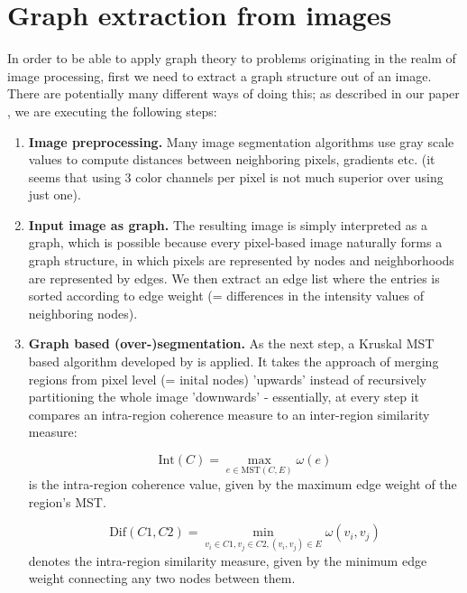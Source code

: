 \section{Graph extraction from images}
\label{sect:graph_ext}
	
	In order to be able to apply graph theory to problems originating in the realm of image processing, first we need to extract a graph structure out of an image. There are potentially many different ways of doing this; as described in our paper \citep{GraphExtractPaper}, we are executing the following steps:
	
	\begin{enumerate}
		\item \textbf{Image preprocessing.} Many image segmentation algorithms use gray scale values to compute distances between neighboring pixels, gradients etc. (it seems that using 3 color channels per pixel is not much superior over using just one).
		\item \textbf{Input image as graph.} The resulting image is simply interpreted as a graph, which is possible because every pixel-based image naturally forms a graph structure, in which pixels are represented by nodes and neighborhoods are represented by edges. We then extract an edge list where the entries is sorted according to edge weight (= differences in the intensity values of neighboring nodes).
		\item \textbf{Graph based (over-)segmentation.} As the next step, a Kruskal MST based algorithm developed by \citep{FelzenszwalbHuttenlocher2004} is applied. It takes the approach of merging regions from pixel level (= inital nodes) 'upwards' instead of recursively partitioning the whole image 'downwards' - essentially, at every step it compares an intra-region coherence measure to an inter-region similarity measure:
		
			\begin{equation*}
			\text{Int}(C) = \max\limits_{e \in \text{MST}(C,E)}  \omega(e)
			\end{equation*}
			is the intra-region coherence value, given by the maximum edge weight of the region's MST.
			
			\par
			\begin{equation*}
			\text{Dif}(C1,C2) = \min\limits_{v_i \in C1, v_j \in C2, (v_i,v_j) \in E} \omega(v_i,v_j)
			\end{equation*}
			denotes the intra-region similarity measure, given by the minimum edge weight connecting any two nodes between them.
			

\end{enumerate}
